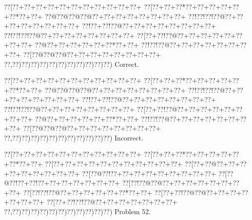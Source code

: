 \documentclass[a5paper]{article}
\begin{document}
\begin{center}
{\goo
\0??[\0??+\0??+\0??+\0??+\0??+\0??+\0??+\0??+\0??+\0??+\0??+
\0??[\0??+\0??+\0??*\0??+\0??+\0??+\0??+\0??+\0??*\0??+\0??+
\0??@\0??@\0??@\0??@\0??+\0??+\0??+\0??+\0??+\0??+\0??+\0??+
\0??!\0??!\0??!\0??@\0??+\0??+\0??+\0??+\0??+\0??+\0??+\0??+
\0??!\0??+\0??!\0??@\0??+\0??+\0??+\0??+\0??+\0??+\0??+\0??+
\0??!\0??!\0??!\0??@\0??+\0??+\0??+\0??+\0??+\0??+\0??+\0??+
\0??[\0??+\0??!\0??@\0??+\0??+\0??+\0??+\0??+\0??+\0??+\0??+
\0??@\0??+\0??+\0??+\0??+\0??+\0??*\0??+\0??+
\0??!\0??!\0??@\0??+\0??+\0??+\0??+\0??+\0??+\0??+\0??+
\0??[\0??@\0??@\0??@\0??+\0??+\0??+\0??+\0??+\0??+\0??+\0??+
\0??,\0??)\0??)\0??)\0??)\0??)\0??)\0??)\0??)\0??)\0??)\0??)
}
Correct. 

\end{center}
\begin{center}
{\goo
\0??[\0??+\0??+\0??+\0??+\0??+\0??+\0??+\0??+\0??+\0??+\0??+
\0??[\0??+\0??+\0??*\0??+\0??+\0??+\0??+\0??+\0??*\0??+\0??+
\0??@\0??@\0??@\0??@\0??+\0??+\0??+\0??+\0??+\0??+\0??+\0??+
\0??!\0??!\0??!\0??@\0??+\0??+\0??+\0??+\0??+\0??+\0??+\0??+
\0??!\0??+\0??!\0??@\0??+\0??+\0??+\0??+\0??+\0??+\0??+\0??+
\0??!\0??!\0??!\0??@\0??+\0??+\0??+\0??+\0??+\0??+\0??+\0??+
\0??[\0??+\0??!\0??@\0??+\0??+\0??+\0??+\0??+\0??+\0??+\0??+
\0??@\0??+\0??+\0??+\0??+\0??+\0??*\0??+\0??+
\0??!\0??!\0??@\0??+\0??+\0??+\0??+\0??+\0??+\0??+\0??+
\0??[\0??@\0??@\0??@\0??+\0??+\0??+\0??+\0??+\0??+\0??+\0??+
\0??,\0??)\0??)\0??)\0??)\0??)\0??)\0??)\0??)\0??)\0??)\0??)
}
Incorrect. 

\end{center}
\newpage
\begin{center}
{\goo
\0??[\0??+\0??+\0??+\0??+\0??+\0??+\0??+\0??+\0??+\0??+\0??+
\0??[\0??+\0??+\0??*\0??+\0??+\0??+\0??+\0??+\0??*\0??+\0??+
\0??[\0??+\0??+\0??+\0??+\0??+\0??+\0??+\0??+\0??+\0??+\0??+
\0??[\0??+\0??@\0??+\0??+\0??+\0??+\0??+\0??+\0??+\0??+\0??+
\0??[\0??@\0??!\0??+\0??+\0??+\0??+\0??+\0??+\0??+\0??+\0??+
\0??[\0??@\0??!\0??+\0??!\0??+\0??+\0??+\0??+\0??+\0??+\0??+
\0??[\0??!\0??@\0??@\0??+\0??+\0??+\0??+\0??+\0??+\0??+\0??+
\0??[\0??!\0??!\0??@\0??+\0??+\0??+\0??+\0??+\0??*\0??+\0??+
\0??[\0??+\0??!\0??@\0??@\0??+\0??+\0??+\0??+\0??+\0??+\0??+
\0??[\0??+\0??!\0??!\0??@\0??+\0??+\0??+\0??+\0??+\0??+\0??+
\0??,\0??)\0??)\0??)\0??)\0??)\0??)\0??)\0??)\0??)\0??)\0??)
}
Problem 52.

\end{center}
\end{document}
